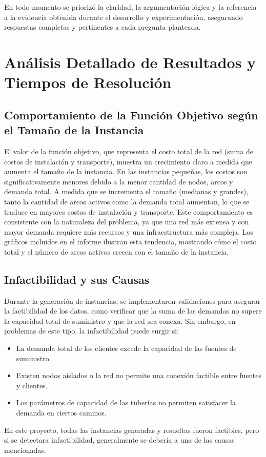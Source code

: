 \documentclass[a4paper,12pt]{article}
\begin{document}
En todo momento se priorizó la claridad, la argumentación lógica y la referencia a la evidencia obtenida durante el desarrollo y experimentación, asegurando respuestas completas y pertinentes a cada pregunta planteada.

\section{Análisis Detallado de Resultados y Tiempos de Resolución}

\subsection{Comportamiento de la Función Objetivo según el Tamaño de la Instancia}
El valor de la función objetivo, que representa el costo total de la red (suma de costos de instalación y transporte), muestra un crecimiento claro a medida que aumenta el tamaño de la instancia. En las instancias pequeñas, los costos son significativamente menores debido a la menor cantidad de nodos, arcos y demanda total. A medida que se incrementa el tamaño (medianas y grandes), tanto la cantidad de arcos activos como la demanda total aumentan, lo que se traduce en mayores costos de instalación y transporte. Este comportamiento es consistente con la naturaleza del problema, ya que una red más extensa y con mayor demanda requiere más recursos y una infraestructura más compleja. Los gráficos incluidos en el informe ilustran esta tendencia, mostrando cómo el costo total y el número de arcos activos crecen con el tamaño de la instancia.

\subsection{Infactibilidad y sus Causas}
Durante la generación de instancias, se implementaron validaciones para asegurar la factibilidad de los datos, como verificar que la suma de las demandas no supere la capacidad total de suministro y que la red sea conexa. Sin embargo, en problemas de este tipo, la infactibilidad puede surgir si:
\begin{itemize}
    \item La demanda total de los clientes excede la capacidad de las fuentes de suministro.
    \item Existen nodos aislados o la red no permite una conexión factible entre fuentes y clientes.
    \item Los parámetros de capacidad de las tuberías no permiten satisfacer la demanda en ciertos caminos.
\end{itemize}
En este proyecto, todas las instancias generadas y resueltas fueron factibles, pero si se detectara infactibilidad, generalmente se debería a una de las causas mencionadas.
\end{document}
